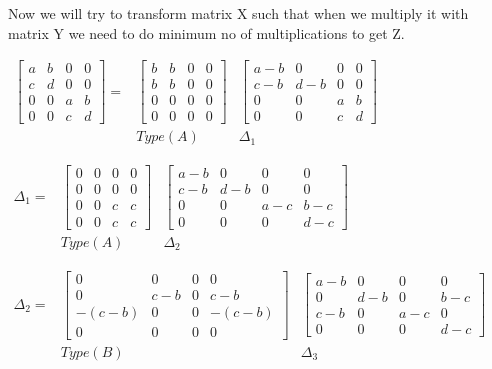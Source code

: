 \documentclass[11pt]{article}
\begin{document}
Now we will try to transform matrix X such that when we multiply it with matrix Y we need to do minimum no of multiplications to get Z.

\begin{center}$\begin{array}{ccc}\begin{bmatrix} a & b & 0 & 0 \\ c & d & 0 & 0 \\ 0 & 0 & a & b \\ 0 & 0 & c & d \end{bmatrix}= &\begin{bmatrix} b & b & 0 & 0 \\b & b & 0 & 0\\0 & 0 & 0 & 0\\ 0 & 0 & 0 & 0 \end{bmatrix} & \begin{bmatrix} a-b & 0 & 0 & 0 \\ c-b & d-b & 0 &0\\ 0 & 0 & a & b \\ 0 & 0 & c & d\end{bmatrix}\\& Type (A) & \Delta_1\end{array}$\end{center}

\begin{center}$\begin{array}{ccc}\Delta_1= &\begin{bmatrix} 0 & 0 & 0 & 0 \\0 & 0 & 0 & 0\\0 & 0 & c & c\\ 0 & 0 & c & c \end{bmatrix} & \begin{bmatrix} a-b & 0 & 0 & 0 \\ c-b & d-b & 0 &0\\ 0 & 0 & a-c & b-c \\ 0 & 0 & 0 & d-c\end{bmatrix}\\& Type (A) & \Delta_2\end{array}$\end{center}

\begin{center}$\begin{array}{ccc}\Delta_2= &\begin{bmatrix} 0 & 0 & 0 & 0 \\0 & c-b & 0 & c-b\\-(c-b) & 0 & 0 & -(c-b)\\ 0 & 0 & 0 & 0 \end{bmatrix} & \begin{bmatrix} a-b & 0 & 0 & 0 \\ 0 & d-b & 0 & b-c\\ c-b & 0 & a-c & 0 \\ 0 & 0 & 0 & d-c\end{bmatrix}\\& Type (B) & \Delta_3\end{array}$\end{center}
\end{document}
